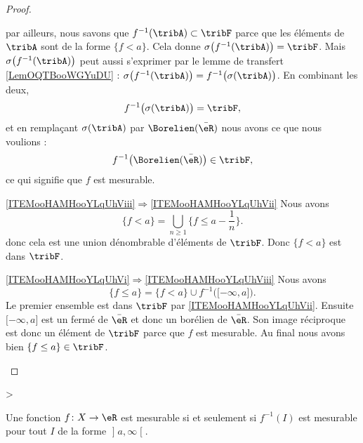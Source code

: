 \begin{proof}
\begin{subproof}
        par ailleurs, nous savons que \( f^{-1}(\tribA)\subset\tribF\) parce que les éléments de \( \tribA\) sont de la forme \( \{ f<a \}\). Cela donne \( \sigma\big( f^{-1}(\tribA) \big)=\tribF\). Mais \( \sigma\big( f^{-1}(\tribA) \big)\) peut aussi s'exprimer par le lemme de transfert \ref{LemOQTBooWGYuDU} : \( \sigma\big( f^{-1}(\tribA) \big)=f^{-1}\big( \sigma(\tribA) \big)\). En combinant les deux,
        \begin{equation}
            f^{-1}\big( \sigma(\tribA) \big)=\tribF,
        \end{equation}
        et en remplaçant \( \sigma(\tribA)\) par \( \Borelien(\bar \eR)\) nous avons ce que nous voulions :
        \begin{equation}
            f^{-1}\big( \Borelien(\bar\eR) \big)\in\tribF,
        \end{equation}
        ce qui signifie que \( f\) est mesurable.
        \item[\ref{ITEMooHAMHooYLqUhViii}\( \Rightarrow\)\ref{ITEMooHAMHooYLqUhVii}]
            Nous avons
            \begin{equation}
                \{ f<a \}=\bigcup_{n\geq 1}\{ f\leq a-\frac{1}{ n } \}.
            \end{equation}
            donc cela est une union dénombrable d'éléments de \( \tribF\). Donc \( \{ f<a \}\) est dans \( \tribF\).
        \item[\ref{ITEMooHAMHooYLqUhVi}\( \Rightarrow\)\ref{ITEMooHAMHooYLqUhViii}]
            Nous avons
            \begin{equation}
                \{ f\leq a \}=\{ f<a \}\cup f^{-1}\big( \mathopen[ -\infty , a \mathclose] \big).
            \end{equation}
            Le premier ensemble est dans \( \tribF\) par \ref{ITEMooHAMHooYLqUhVii}. Ensuite \( \mathopen[ -\infty , a \mathclose]\) est un fermé de \( \bar \eR\) et donc un borélien de \( \bar \eR\). Son image réciproque est donc un élément de \( \tribF\) parce que \( f\) est mesurable. Au final nous avons bien \( \{ f\leq a \}\in\tribF\).
    \end{subproof}
\end{proof}
>

\begin{lemma}   \label{LemFOlheqw}
    Une fonction \( f\colon X\to \eR\) est mesurable si et seulement si \( f^{-1}(I)\) est mesurable pour tout \( I\) de la forme \( \mathopen] a , \infty \mathclose[\).
\end{lemma}

